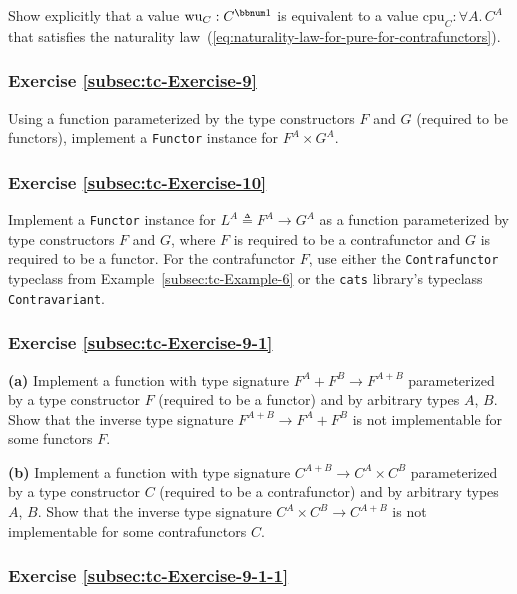 Show explicitly that a value $\text{wu}_{C}:C^{\bbnum 1}$ is equivalent
to a value $\text{cpu}_{C}:\forall A.\,C^{A}$ that satisfies the
naturality law~(\ref{eq:naturality-law-for-pure-for-contrafunctors}).

\subsubsection{Exercise \label{subsec:tc-Exercise-9}\ref{subsec:tc-Exercise-9}}

Using a function parameterized by the type constructors $F$ and $G$
(required to be functors), implement a \lstinline!Functor! instance
for $F^{A}\times G^{A}$. 

\subsubsection{Exercise \label{subsec:tc-Exercise-10}\ref{subsec:tc-Exercise-10}}

Implement a \lstinline!Functor! instance for $L^{A}\triangleq F^{A}\rightarrow G^{A}$
as a function parameterized by type constructors $F$ and $G$, where
$F$ is required to be a contrafunctor and $G$ is required to be
a functor. For the contrafunctor $F$, use either the \lstinline!Contrafunctor!
typeclass from Example~\ref{subsec:tc-Example-6} or the \texttt{cats}
library\textsf{'}s typeclass \lstinline!Contravariant!.

\subsubsection{Exercise \label{subsec:tc-Exercise-9-1}\ref{subsec:tc-Exercise-9-1}}

\textbf{(a)} Implement a function with type signature $F^{A}+F^{B}\rightarrow F^{A+B}$
parameterized by a type constructor $F$ (required to be a functor)
and by arbitrary types $A$, $B$. Show that the inverse type signature
$F^{A+B}\rightarrow F^{A}+F^{B}$ is not implementable for some functors
$F$. 

\textbf{(b)} Implement a function with type signature $C^{A+B}\rightarrow C^{A}\times C^{B}$
parameterized by a type constructor $C$ (required to be a contrafunctor)
and by arbitrary types $A$, $B$. Show that the inverse type signature
$C^{A}\times C^{B}\rightarrow C^{A+B}$ is not implementable for some
contrafunctors $C$.

\subsubsection{Exercise \label{subsec:tc-Exercise-9-1-1}\ref{subsec:tc-Exercise-9-1-1}}

